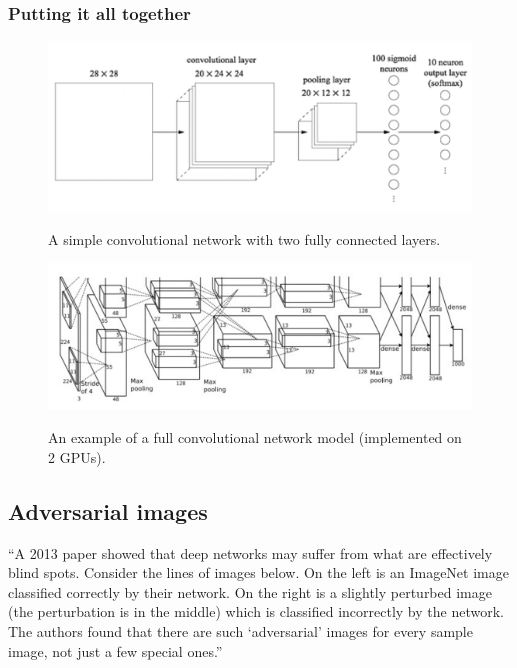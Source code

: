\documentclass[12pt]{article}
\begin{document}
\subsubsection*{Putting it all together}

\begin{figure}[!ht]
    \includegraphics[scale=0.8]{conv-simple.png}
    \centering

    A simple convolutional network with two fully connected layers.
\end{figure}

\begin{figure}[!ht]
    \includegraphics[scale=0.8]{conv.png}

    \centering
    An example of a full convolutional network model (implemented on 2 GPUs).
\end{figure}

\subsection*{Adversarial images}

``A 2013 paper showed that deep networks may suffer from what are effectively blind spots. Consider the lines of images below. On the left is an ImageNet image classified correctly by their network. On the right is a slightly perturbed image (the perturbation is in the middle) which is classified incorrectly by the network. The authors found that there are such `adversarial' images for every sample image, not just a few special ones.''
\end{document}
